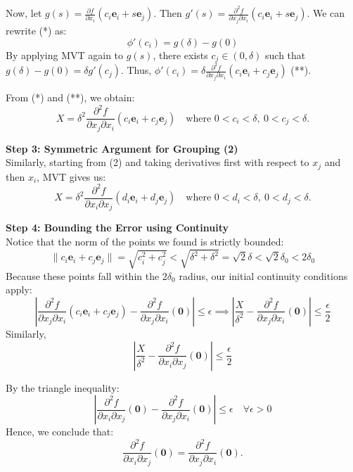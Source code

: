 \documentclass[12pt]{article}
\begin{document}
\begin{dbox}
\begin{pf}
Now, let $g(s) = \frac{\partial f}{\partial x_i}(c_i \mathbf{e}_i + s \mathbf{e}_j)$. Then $g'(s) = \frac{\partial^2 f}{\partial x_j \partial x_i}(c_i \mathbf{e}_i + s \mathbf{e}_j)$.
We can rewrite (*) as:
$$ \phi'(c_i) = g(\delta) - g(0) $$
By applying MVT again to $g(s)$, there exists $c_j \in (0, \delta)$ such that $g(\delta) - g(0) = \delta g'(c_j)$.
Thus, $\phi'(c_i) = \delta \frac{\partial^2 f}{\partial x_j \partial x_i}(c_i \mathbf{e}_i + c_j \mathbf{e}_j)$ \quad (**).

From (*) and (**), we obtain:
$$ X = \delta^2 \frac{\partial^2 f}{\partial x_j \partial x_i}(c_i \mathbf{e}_i + c_j \mathbf{e}_j) \quad \text{where } 0 < c_i < \delta, \ 0 < c_j < \delta. $$

\vspace{0.8em}
\noindent \textbf{Step 3: Symmetric Argument for Grouping (2)}\\
Similarly, starting from (2) and taking derivatives first with respect to $x_j$ and then $x_i$, MVT gives us:
$$ X = \delta^2 \frac{\partial^2 f}{\partial x_i \partial x_j}(d_i \mathbf{e}_i + d_j \mathbf{e}_j) \quad \text{where } 0 < d_i < \delta, \ 0 < d_j < \delta. $$

\vspace{0.8em}
\noindent \textbf{Step 4: Bounding the Error using Continuity}\\
Notice that the norm of the points we found is strictly bounded:
$$ \|c_i \mathbf{e}_i + c_j \mathbf{e}_j\| = \sqrt{c_i^2 + c_j^2} < \sqrt{\delta^2 + \delta^2} = \sqrt{2}\delta < \sqrt{2}\delta_0 < 2\delta_0 $$
Because these points fall within the $2\delta_0$ radius, our initial continuity conditions apply:
$$ \left| \frac{\partial^2 f}{\partial x_j \partial x_i}(c_i \mathbf{e}_i + c_j \mathbf{e}_j) - \frac{\partial^2 f}{\partial x_j \partial x_i}(\mathbf{0}) \right| \le \epsilon \implies \left| \frac{X}{\delta^2} - \frac{\partial^2 f}{\partial x_j \partial x_i}(\mathbf{0}) \right| \le  \frac{\epsilon}{2} $$
Similarly,
$$ \left| \frac{X}{\delta^2} - \frac{\partial^2 f}{\partial x_i \partial x_j}(\mathbf{0}) \right| \le  \frac{\epsilon}{2} $$

By the triangle inequality:
$$ \left| \frac{\partial^2 f}{\partial x_i \partial x_j}(\mathbf{0}) - \frac{\partial^2 f}{\partial x_j \partial x_i}(\mathbf{0}) \right| \le \epsilon \quad \forall \epsilon > 0 $$
Hence, we conclude that:
$$ \frac{\partial^2 f}{\partial x_i \partial x_j}(\mathbf{0}) = \frac{\partial^2 f}{\partial x_j \partial x_i}(\mathbf{0}). $$
\end{pf}
\end{dbox}
\end{document}
